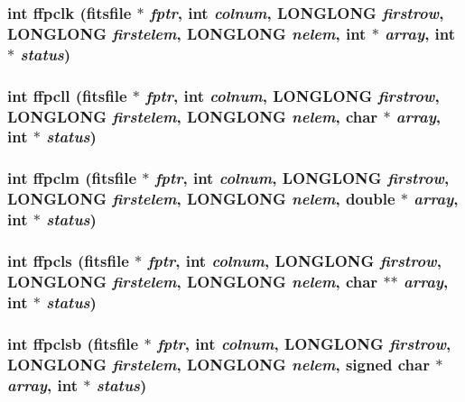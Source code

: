 \subsubsection{\setlength{\rightskip}{0pt plus 5cm}int ffpclk (\bf{fitsfile} $\ast$ {\em fptr}, int {\em colnum}, \bf{LONGLONG} {\em firstrow}, \bf{LONGLONG} {\em firstelem}, \bf{LONGLONG} {\em nelem}, int $\ast$ {\em array}, int $\ast$ {\em status})}\label{fitsio__64_8h_d4e01a4e0406be50e5e104f31f5c8fea}


\subsubsection{\setlength{\rightskip}{0pt plus 5cm}int ffpcll (\bf{fitsfile} $\ast$ {\em fptr}, int {\em colnum}, \bf{LONGLONG} {\em firstrow}, \bf{LONGLONG} {\em firstelem}, \bf{LONGLONG} {\em nelem}, char $\ast$ {\em array}, int $\ast$ {\em status})}\label{fitsio__64_8h_353d8ec816b71620a84af201290d5932}


\subsubsection{\setlength{\rightskip}{0pt plus 5cm}int ffpclm (\bf{fitsfile} $\ast$ {\em fptr}, int {\em colnum}, \bf{LONGLONG} {\em firstrow}, \bf{LONGLONG} {\em firstelem}, \bf{LONGLONG} {\em nelem}, double $\ast$ {\em array}, int $\ast$ {\em status})}\label{fitsio__64_8h_af1f2dc6beaea63dbf91a8be037be940}


\subsubsection{\setlength{\rightskip}{0pt plus 5cm}int ffpcls (\bf{fitsfile} $\ast$ {\em fptr}, int {\em colnum}, \bf{LONGLONG} {\em firstrow}, \bf{LONGLONG} {\em firstelem}, \bf{LONGLONG} {\em nelem}, char $\ast$$\ast$ {\em array}, int $\ast$ {\em status})}\label{fitsio__64_8h_d58114695cd1281daa17eff622c1e38a}


\subsubsection{\setlength{\rightskip}{0pt plus 5cm}int ffpclsb (\bf{fitsfile} $\ast$ {\em fptr}, int {\em colnum}, \bf{LONGLONG} {\em firstrow}, \bf{LONGLONG} {\em firstelem}, \bf{LONGLONG} {\em nelem}, signed char $\ast$ {\em array}, int $\ast$ {\em status})}\label{fitsio__64_8h_3c19da60283d0f6c16d2c4508ee2b551}


